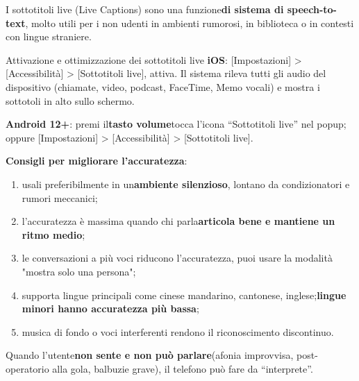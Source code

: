 
I sottotitoli live (Live Captions) sono una funzione\textbf{di sistema di speech-to-text}, molto utili per i non udenti in ambienti rumorosi, in biblioteca o in contesti con lingue straniere.

\begin{tcbinfo}{Attivazione e ottimizzazione dei sottotitoli live}
\textbf{iOS}: [Impostazioni] > [Accessibilità] > [Sottotitoli live], attiva. Il sistema rileva tutti gli audio del dispositivo (chiamate, video, podcast, FaceTime, Memo vocali) e mostra i sottotoli in alto sullo schermo.

\textbf{Android 12+}: premi il\textbf{tasto volume}tocca l'icona “Sottotitoli live” nel popup; oppure [Impostazioni] > [Accessibilità] > [Sottotitoli live].

\textbf{Consigli per migliorare l'accuratezza}:

\begin{enumerate}
  \item usali preferibilmente in un\textbf{ambiente silenzioso}, lontano da condizionatori e rumori meccanici;
  \item l'accuratezza è massima quando chi parla\textbf{articola bene e mantiene un ritmo medio};
  \item le conversazioni a più voci riducono l'accuratezza, puoi usare la modalità "mostra solo una persona";
  \item supporta lingue principali come cinese mandarino, cantonese, inglese;\textbf{lingue minori hanno accuratezza più bassa};
  \item musica di fondo o voci interferenti rendono il riconoscimento discontinuo.
\end{enumerate}

\end{tcbinfo}


Quando l'utente\textbf{non sente e non può parlare}(afonia improvvisa, post-operatorio alla gola, balbuzie grave), il telefono può fare da “interprete”.


